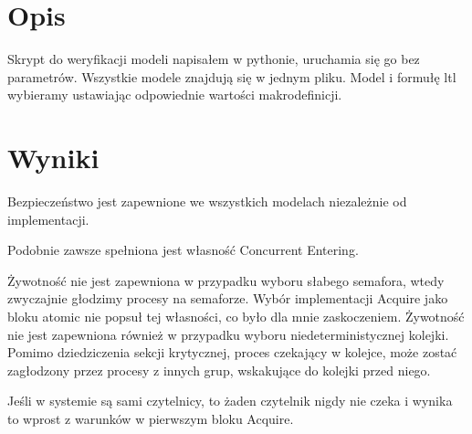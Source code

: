 \documentclass[12pt,onecolumn,a4paper]{article}
\begin{document}
\newpage
\onecolumn

\section{Opis}
Skrypt do weryfikacji modeli napisałem w pythonie, uruchamia się go bez parametrów.
Wszystkie modele znajdują się w jednym pliku. Model i formułę ltl wybieramy ustawiając odpowiednie wartości makrodefinicji.

\section{Wyniki}
Bezpieczeństwo jest zapewnione we wszystkich modelach niezależnie od implementacji.

Podobnie zawsze spełniona jest własność Concurrent Entering.

Żywotność nie jest zapewniona w przypadku wyboru słabego semafora, wtedy zwyczajnie głodzimy procesy na semaforze. Wybór implementacji Acquire jako bloku atomic nie popsuł tej własności, co było dla mnie zaskoczeniem.
Żywotność nie jest zapewniona również w przypadku wyboru niedeterministycznej kolejki. Pomimo dziedziczenia sekcji krytycznej, proces czekający w kolejce, może zostać zagłodzony przez procesy z innych grup, wskakujące do kolejki przed niego.

Jeśli w systemie są sami czytelnicy, to żaden czytelnik nigdy nie czeka i wynika to wprost z warunków w pierwszym bloku Acquire.
\end{document}
